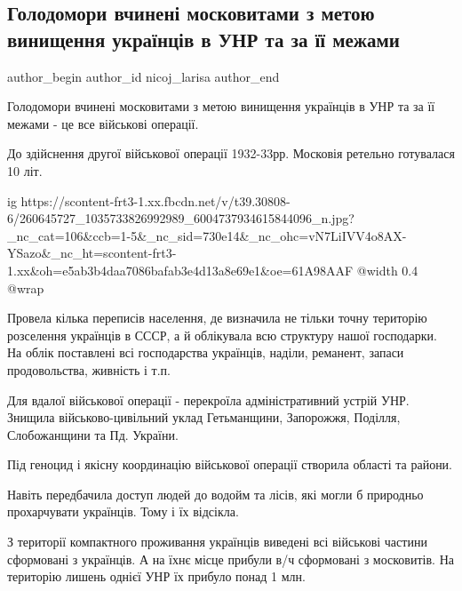  
 
 
 
 
 
\subsection{Голодомори вчинені московитами з метою винищення українців в УНР та за її межами}
\label{sec:27_11_2021.fb.nicoj_larisa.1.golodomory}
 
\ifcmt
 author_begin
   author_id nicoj_larisa
 author_end
\fi

Голодомори вчинені московитами з метою винищення українців в УНР та за її
межами - це все військові операції. 

До здійснення другої військової операції 1932-33рр. Московія ретельно
готувалася 10 літ. 

\ifcmt
  ig https://scontent-frt3-1.xx.fbcdn.net/v/t39.30808-6/260645727_1035733826992989_6004737934615844096_n.jpg?_nc_cat=106&ccb=1-5&_nc_sid=730e14&_nc_ohc=vN7LiIVV4o8AX-YSazo&_nc_ht=scontent-frt3-1.xx&oh=e5ab3b4daa7086bafab3e4d13a8e69e1&oe=61A98AAF
  @width 0.4
  @wrap 
\fi

Провела кілька переписів населення, де визначила не тільки точну територію
розселення українців в СССР, а й облікувала всю структуру нашої господарки. На
облік поставлені всі господарства українців, наділи, реманент, запаси
продовольства, живність і т.п. 

Для вдалої військової операції - перекроїла адміністративний устрій УНР.
Знищила  військово-цивільний уклад Гетьманщини, Запорожжя, Поділля,
Слобожанщини та Пд. України. 

Під геноцид і якісну координацію військової операції створила області та
райони. 

Навіть передбачила доступ людей до водойм та лісів, які могли б природньо
прохарчувати українців. Тому і їх відсікла. 

З території компактного проживання українців виведені всі військові частини
сформовані з українців. А на їхнє місце прибули в/ч сформовані з московитів. На
територію лишень однієї УНР їх прибуло понад 1 млн. 

